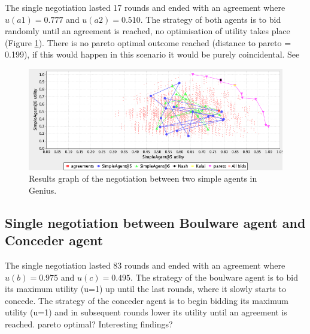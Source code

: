 \documentclass[a4paper]{article}
\begin{document}
The single negotiation lasted 17 rounds and ended with an agreement where $u(a1) = 0.777$ and $u(a2) = 0.510$. The strategy of both agents is to bid randomly until an agreement is reached, no optimisation of utility takes place (Figure \ref{fig:simplevssimple}). There is no pareto optimal outcome reached (distance to pareto = 0.199), if this would happen in this scenario it would be purely coincidental. See

\begin{figure}[h!]
\centering
\includegraphics[width=125mm]{simplevssimple.png}
\caption{\label{fig:simplevssimple} Results graph of the negotiation between two simple agents in Genius.}  
\end{figure}

\subsection{Single negotiation between Boulware agent and Conceder agent}

The single negotiation lasted 83 rounds and ended with an agreement where $u(b) = 0.975$ and $u(c) = 0.495$. The strategy of the boulware agent is to bid its maximum utility (u=1) up until the last rounds, where it slowly starts to concede. The strategy of the conceder agent is to begin bidding its maximum utility (u=1) and in subsequent rounds lower its utility until an agreement is reached. pareto optimal? Interesting findings?
\end{document}
